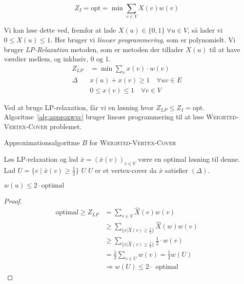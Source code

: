 \begin{equation*}
	Z_{I} = \text{opt} = \min \sum_{v \in V} X(v) w(v)
\end{equation*}

Vi kan løse dette ved, fremfor at lade $X(u) \in \{0,1\}\; \forall u \in V$, så lader vi $0 \le X(u) \le 1$. Her bruger vi \textit{lineær programmering}, som er polynomielt. Vi bruger \textit{LP-Relaxation} metoden, som er metoden der tillader $X(u)$ til at have værdier mellem, og inklusiv, 0 og 1.
\begin{align*}
	Z_{LP}        & = \min \sum_{v} x(v) \cdot w(v)           \\
	\Delta	 \quad & x(u) + x(v) \geq 1 \quad \forall uv \in E \\
	              & 0 \leq x(v) \leq 1 \quad \forall v \in V
\end{align*}

Ved at bruge LP-relaxation, får vi en løsning hvor $Z_{LP} \le Z_{I} = \text{opt}$. Algoritme~\ref{alg:approxwvc} bruger lineær programmering til at løse \textsc{Weighted-Vertex-Cover} problemet.

\begin{algorithm}
	\caption{\label{alg:approxwvc}Approximationsalgoritme $B$ for \textsc{Weighted-Vertex-Cover}}
	\begin{algorithmic}[1]
		\STATE Løs LP-relaxation og lad $\bar{x} = (\bar{x}(v))_{v \in V}$ være en optimal løsning til denne.
		\STATE Lad $U = \{v \mid \bar{x}(v) \geq \frac{1}{2}\}$
		\RETURN $U$
		\STATE $U$ er et vertex-cover da $\bar{x}$ satisfier $(\Delta)$.
	\end{algorithmic}
\end{algorithm}

\begin{claim}
	$w(u) \le 2 \cdot \text{optimal}$
\end{claim}

\begin{proof}
	\begin{align*}
		\text{optimal} \ge Z_{LP} & = \sum_{v \in V} \hat{X}(v)w(v)                                      \\
		                          & \ge \sum_{\{ v |\hat{X}(v) \ge \frac{1}{2}\}} \hat{X}(w)w(v)    \\
		                          & \ge \sum_{\{ v |\hat{X}(v) \ge \frac{1}{2}\}} \frac{1}{2} \cdot w(v) \\
		                          & = \frac{1}{2} \sum_{v \in U} w(v) = \frac{1}{2} w(U)                      \\
		                          & \Rightarrow w(U) \le 2 \cdot \text{ optimal}
	\end{align*}
\end{proof}

